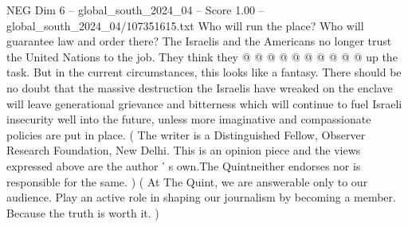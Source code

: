 \begin{textsample}{NEG Dim 6 – global\_south\_2024\_04 – Score 1.00 – global\_south\_2024\_04/107351615.txt}
Who will run the place?
Who will guarantee law and order there?
The Israelis and the Americans no longer trust the United Nations to the job.
They think they @ @ @ @ @ @ @ @ @ @ up the task.
But in the current circumstances, this looks like a fantasy.
There should be no doubt that the massive destruction the Israelis have wreaked on the enclave will leave generational grievance and bitterness which will continue to fuel Israeli insecurity well into the future, unless more imaginative and compassionate policies are put in place. ( The writer is a Distinguished Fellow, Observer Research Foundation, New Delhi.
This is an opinion piece and the views expressed above are the author ' s own.The Quintneither endorses nor is responsible for the same. ) ( At The Quint, we are answerable only to our audience.
Play an active role in shaping our journalism by becoming a member.
Because the truth is worth it. )

\end{textsample}
